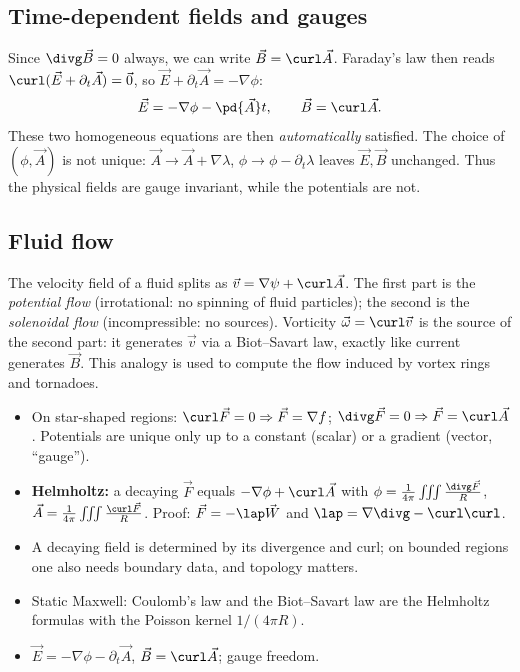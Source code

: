 \subsection{Time-dependent fields and gauges}

Since $\divg\vec B=0$ always, we can write $\vec B=\curl\vec A$. Faraday's law then reads $\curl(\vec E+\partial_t\vec A)=\vec0$, so $\vec E+\partial_t\vec A=-\nabla\phi$:
\[
\vec E=-\nabla\phi-\pd{\vec A}t,\qquad\vec B=\curl\vec A .
\]
These two homogeneous equations are then \emph{automatically} satisfied. The choice of $(\phi,\vec A)$ is not unique: $\vec A\to\vec A+\nabla\lambda$, $\phi\to\phi-\partial_t\lambda$ leaves $\vec E,\vec B$ unchanged. Thus the physical fields are gauge invariant, while the potentials are not.

\subsection{Fluid flow}

The velocity field of a fluid splits as $\vec v=\nabla\psi+\curl\vec A$. The first part is the \emph{potential flow} (irrotational: no spinning of fluid particles); the second is the \emph{solenoidal flow} (incompressible: no sources). Vorticity $\vec\omega=\curl\vec v$ is the source of the second part: it generates $\vec v$ via a Biot--Savart law, exactly like current generates $\vec B$. This analogy is used to compute the flow induced by vortex rings and tornadoes.

\begin{summarybox}
\begin{itemize}
  \item On star-shaped regions: $\curl\vec F=0\Rightarrow\vec F=\nabla f$; $\divg\vec F=0\Rightarrow\vec F=\curl\vec A$. Potentials are unique only up to a constant (scalar) or a gradient (vector, ``gauge'').
  \item \textbf{Helmholtz:} a decaying $\vec F$ equals $-\nabla\phi+\curl\vec A$ with $\phi=\frac1{4\pi}\iiint\frac{\divg\vec F}R$, $\vec A=\frac1{4\pi}\iiint\frac{\curl\vec F}R$. Proof: $\vec F=-\lap\vec W$ and $\lap=\nabla\divg-\curl\curl$.
  \item A decaying field is determined by its divergence and curl; on bounded regions one also needs boundary data, and topology matters.
  \item Static Maxwell: Coulomb's law and the Biot--Savart law are the Helmholtz formulas with the Poisson kernel $1/(4\pi R)$.
  \item $\vec E=-\nabla\phi-\partial_t\vec A$, $\vec B=\curl\vec A$; gauge freedom.
\end{itemize}
\end{summarybox}

